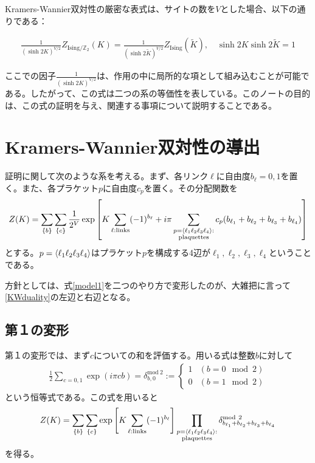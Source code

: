 \documentclass[a4paper,12pt,dvipdfmx]{jlreq}
\newenvironment{important}{\begin{tcolorbox}[
  colback = white,
  colframe = red!35,
  boxrule = 2mm,
  fonttitle = \bfseries,
  after = \noindent] }{\end{tcolorbox}}
\newcommand{\Kt}{\widetilde{K}}
\newcommand{\ZIs}{Z_{\mathrm{Ising}}}
\newcommand{\ZGIs}{Z_{\mathrm{Ising}/\mathbb{Z}_2}}
\newcommand{\deltamod}{\delta^{\mathrm{mod}\ 2}}
\begin{document}
Kramers-Wannier双対性の厳密な表式は、サイトの数を$V$とした場合、以下の通りである：
\begin{important}
\begin{align}
\frac{1}{(\sinh 2K)^{V/2}}\ZGIs(K)=
\frac{1}{(\sinh 2\Kt)^{V/2}}\ZIs(\Kt),\quad \sinh 2K \sinh 2\Kt=1
\label{KWduality}
\end{align}
\end{important}
ここでの因子$\frac{1}{(\sinh 2K)^{V/2}}$は、作用の中に局所的な項として組み込むことが可能である。したがって、この式は二つの系の等価性を表している。このノートの目的は、この式の証明を与え、関連する事項について説明することである。

\section{Kramers-Wannier双対性の導出}
証明に関して次のような系を考える。まず、各リンク$\ell$に自由度$b_{\ell}=0,1$を置く。また、各プラケット$p$に自由度$c_{p}$を置く。その分配関数を
\begin{align}
  Z(K)=\sum_{\{b\}}\sum_{\{c\}}\frac{1}{2^{V}} \exp\left[
    K\sum_{\ell:\text{links}}(-1)^{b_{\ell}}+i\pi\sum_{\substack{p=\expval{\ell_1 \ell_2 \ell_3 \ell_4}:\\ \text{plaquettes}}} c_{p}(b_{\ell_1}+b_{\ell_2}+b_{\ell_3}+b_{\ell_4})
  \right]
  \label{model1}
\end{align}
とする。$p=\expval{\ell_1 \ell_2 \ell_3 \ell_4}$はプラケット$p$を構成する4辺が$\ell_1, \ell_2, \ell_3, \ell_4$ということである。

方針としては、式\eqref{model1}を二つのやり方で変形したのが、大雑把に言って\eqref{KWduality}の左辺と右辺となる。

\subsection{第１の変形}
第１の変形では、まず$c$についての和を評価する。用いる式は整数$b$に対して 
\begin{align}
  \frac12\sum_{c=0,1}\exp(i\pi c b )
  =\deltamod_{b,0}
  :=
  \begin{cases}
    1& (b=0 \mod 2)\\
    0& (b=1 \mod 2)
  \end{cases}
  \label{deltamod}
\end{align}
という恒等式である。この式を用いると
\begin{align}
  Z(K)=\sum_{\{b\}}\sum_{\{c\}}\exp\left[
    K\sum_{\ell:\text{links}}(-1)^{b_{\ell}}
    \right]
    \prod_{\substack{p=\expval{\ell_1 \ell_2 \ell_3 \ell_4}:\\ \text{plaquettes}}} \deltamod_{b_{\ell_1}+b_{\ell_2}+b_{\ell_3}+b_{\ell_4}}
    \label{model1-1-1}
\end{align}
を得る。
\end{document}
